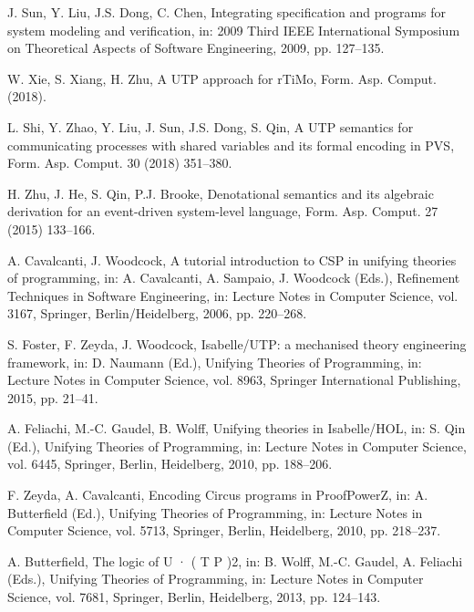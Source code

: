 \documentclass[11pt]{article}
\begin{document}
\begin{enumerate}[label={[\arabic*]}, leftmargin=*, itemsep=0.4em]
\item J. Sun, Y. Liu, J.S. Dong, C. Chen, Integrating specification and programs for system modeling and verification, in: 2009 Third IEEE International Symposium on Theoretical Aspects of Software Engineering, 2009, pp. 127–135.
\item W. Xie, S. Xiang, H. Zhu, A UTP approach for rTiMo, Form. Asp. Comput. (2018).
\item L. Shi, Y. Zhao, Y. Liu, J. Sun, J.S. Dong, S. Qin, A UTP semantics for communicating processes with shared variables and its formal encoding in PVS, Form. Asp. Comput. 30 (2018) 351–380.
\item H. Zhu, J. He, S. Qin, P.J. Brooke, Denotational semantics and its algebraic derivation for an event-driven system-level language, Form. Asp. Comput. 27 (2015) 133–166.
\item A. Cavalcanti, J. Woodcock, A tutorial introduction to CSP in unifying theories of programming, in: A. Cavalcanti, A. Sampaio, J. Woodcock (Eds.), Refinement Techniques in Software Engineering, in: Lecture Notes in Computer Science, vol. 3167, Springer, Berlin/Heidelberg, 2006, pp. 220–268.
\item S. Foster, F. Zeyda, J. Woodcock, Isabelle/UTP: a mechanised theory engineering framework, in: D. Naumann (Ed.), Unifying Theories of Programming, in: Lecture Notes in Computer Science, vol. 8963, Springer International Publishing, 2015, pp. 21–41.
\item A. Feliachi, M.-C. Gaudel, B. Wolff, Unifying theories in Isabelle/HOL, in: S. Qin (Ed.), Unifying Theories of Programming, in: Lecture Notes in Computer Science, vol. 6445, Springer, Berlin, Heidelberg, 2010, pp. 188–206.
\item F. Zeyda, A. Cavalcanti, Encoding Circus programs in ProofPowerZ, in: A. Butterfield (Ed.), Unifying Theories of Programming, in: Lecture Notes in Computer Science, vol. 5713, Springer, Berlin, Heidelberg, 2010, pp. 218–237.
\item A. Butterfield, The logic of U · ( T P )2, in: B. Wolff, M.-C. Gaudel, A. Feliachi (Eds.), Unifying Theories of Programming, in: Lecture Notes in Computer Science, vol. 7681, Springer, Berlin, Heidelberg, 2013, pp. 124–143.
\end{enumerate}
\end{document}
